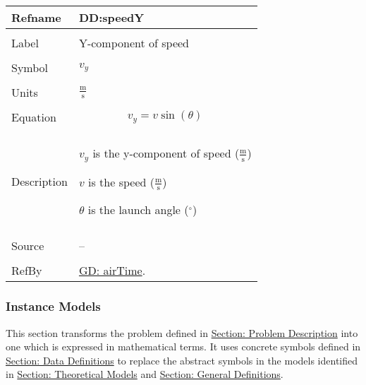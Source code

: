 \documentclass[12pt]{article}
\begin{document}
\noindent \begin{minipage}{\textwidth}
\begin{tabular}{p{} p{}}
\toprule \textbf{Refname} & \textbf{DD:speedY}
\label{DD:speedY}
\\ \midrule \\
Label & Y-component of speed
\\ \midrule \\
Symbol & ${v_{y}}$
\\ \midrule \\
Units & $\frac{\text{m}}{\text{s}}$
\\ \midrule \\
Equation & \begin{displaymath}
           {v_{y}}=v \sin\left(θ\right)
           \end{displaymath}
\\ \midrule \\
Description & \begin{symbDescription}
              \item{${v_{y}}$ is the y-component of speed ($\frac{\text{m}}{\text{s}}$)}
              \item{$v$ is the speed ($\frac{\text{m}}{\text{s}}$)}
              \item{$θ$ is the launch angle (${}^{\circ}$)}
              \end{symbDescription}
\\ \midrule \\
Source & --
\\ \midrule \\
RefBy & \hyperref[GD:airTime]{GD: airTime}.
\\ \bottomrule \end{tabular}
\end{minipage}
\subsubsection{Instance Models}
\label{Sec:IMs}
This section transforms the problem defined in \hyperref[Sec:ProbDesc]{Section: Problem Description} into one which is expressed in mathematical terms. It uses concrete symbols defined in \hyperref[Sec:DDs]{Section: Data Definitions} to replace the abstract symbols in the models identified in \hyperref[Sec:TMs]{Section: Theoretical Models} and \hyperref[Sec:GDs]{Section: General Definitions}.
\par~
\end{document}
